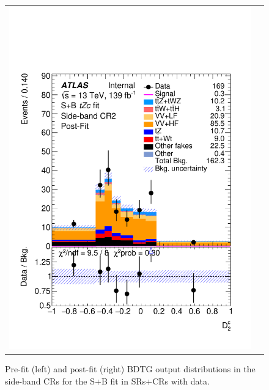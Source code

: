\begin{figure}[htbp]
\begin{tabular}{cc}
		\includegraphics[width=.45\textwidth]{Chapters/CH8/figures/SPLUSB_CRSR_DL1rc_unblind/Plots/SBCR2_postFit} \\
	\end{tabular}
	\caption{Pre-fit (left) and post-fit (right) BDTG output distributions in the side-band CRs for the S+B \tZc fit in SRs+CRs with data.
		\ErrStatSys
	}%
	\label{fig:stat:tzc:splusb:crsr:crplots:1_unb}
\end{figure}

